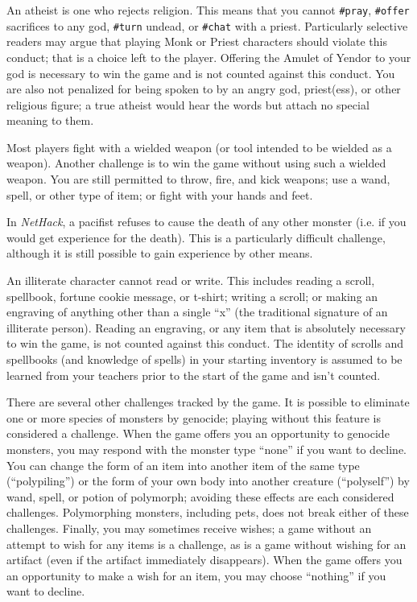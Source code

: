 An atheist is one who rejects religion.  This means that you cannot
{\tt \#pray}, {\tt \#offer} sacrifices to any god,
{\tt \#turn} undead, or {\tt \#chat} with a priest.
Particularly selective readers may argue that playing Monk or Priest
characters should violate this conduct; that is a choice left to the
player.  Offering the Amulet of Yendor to your god is necessary to
win the game and is not counted against this conduct.  You are also
not penalized for being spoken to by an angry god, priest(ess), or
other religious figure; a true atheist would hear the words but
attach no special meaning to them.

Most players fight with a wielded weapon (or tool intended to be
wielded as a weapon).  Another challenge is to win the game without
using such a wielded weapon.  You are still permitted to throw,
fire, and kick weapons; use a wand, spell, or other type of item;
or fight with your hands and feet.

In {\it NetHack\/}, a pacifist refuses to cause the death of any other monster
(i.e. if you would get experience for the death).  This is a particularly
difficult challenge, although it is still possible to gain experience
by other means.

An illiterate character cannot read or write.  This includes reading
a scroll, spellbook, fortune cookie message, or t-shirt; writing a
scroll; or making an engraving of anything other than a single ``x'' (the
traditional signature of an illiterate person).  Reading an engraving,
or any item that is absolutely necessary to win the game, is not counted
against this conduct.  The identity of scrolls and spellbooks (and
knowledge of spells) in your starting inventory is assumed to be
learned from your teachers prior to the start of the game and isn't
counted.

There are several other challenges tracked by the game.  It is possible
to eliminate one or more species of monsters by genocide; playing without
this feature is considered a challenge.  When the game offers you an
opportunity to genocide monsters, you may respond with the monster type
``none'' if you want to decline.  You can change the form of an item into
another item of the same type (``polypiling'') or the form of your own
body into another creature (``polyself'') by wand, spell, or potion of
polymorph; avoiding these effects are each considered challenges.
Polymorphing monsters, including pets, does not break either of these
challenges.
Finally, you may sometimes receive wishes; a game without an attempt to
wish for any items is a challenge, as is a game without wishing for
an artifact (even if the artifact immediately disappears).  When the
game offers you an opportunity to make a wish for an item, you may
choose ``nothing'' if you want to decline.

